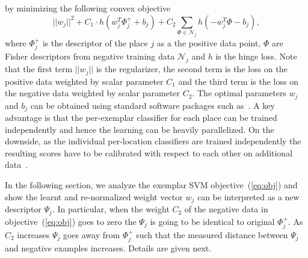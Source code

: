 \documentclass[table]{article} %
\begin{document}
	by minimizing the following convex objective  
\begin{equation}
	        ||w_j||^{2} +C_1 \cdot h
	        				\left(
	        				w_j^T\Phi^+_j+b_j
	        				\right)
	                         +C_2\sum_{\Phi\in \mathcal N_j}h
	                         \left(
	                         -w_j^T\Phi-b_j
	                         \right), 	
	       	\label{eq:obj} 
	  	\end{equation}
	  	where $\Phi^+_j$ is the descriptor of the place $j$ as a the positive data point, $\Phi$ are Fisher descriptors from negative training data $\mathcal N_j$ and $h$ is the hinge loss. Note that the first term $||w_j||$ is the regularizer, the second term is the loss on the positive data weighted by scalar parameter $C_1$ and the third term is the loss on the negative data weighted by scalar parameter $C_2$. The optimal parameters $w_j$ and $b_j$ can be obtained using standard software packages such as~\cite{libsvm}. A key advantage is that the per-exemplar classifier for each place can be trained independently and hence the learning can be heavily parallelized. On the downside, as the individual per-location classifiers are trained independently the resulting scores have to be calibrated with respect to each other on additional data~\cite{Gronat13,Malisiewicz11}.

In the following section, we analyze the exemplar SVM objective~(\ref{eq:obj}) and show the learnt \textcolor{myRed}{and re-normalized} weight vector $w_j$ can be interpreted as 
a new descriptor $\Psi_j$.  In particular, when the weight $C_2$ of the negative data in objective~(\ref{eq:obj}) goes to zero the $\Psi_j$ is going to be identical to original $\Phi_j^+$.  As $C_2$ increases $\Psi_j$ goes away from $\Phi_j^+$ such that the measured distance between $\Psi_j$ and negative examples increases.
Details are given next.

   		
		
\end{document}
